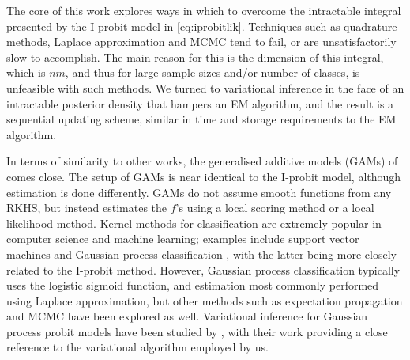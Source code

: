 \documentclass[showframe,11pt,twoside,openright]{report}
\begin{document}
The core of this work explores ways in which to overcome the intractable integral presented by the I-probit model in \cref{eq:iprobitlik}.
Techniques such as quadrature methods, Laplace approximation and MCMC tend to fail, or are unsatisfactorily slow to accomplish.
The main reason for this is the dimension of this integral, which is $nm$, and thus for large sample sizes and/or number of classes, is unfeasible with such methods.
We turned to variational inference in the face of an intractable posterior density that hampers an EM algorithm, and the result is a sequential updating scheme, similar in time and storage requirements to the EM algorithm.

In terms of similarity to other works, the generalised additive models (GAMs) of \citet{hastie1986} comes close.
The setup of GAMs is near identical to the I-probit model, although estimation is done differently. 
GAMs do not assume smooth functions from any RKHS, but instead estimates the $f$'s using a local scoring method or a local likelihood method.
Kernel methods for classification are extremely popular in computer science and machine learning; examples include support vector machines \citep{scholkopf2002learning} and Gaussian process classification \citep{rasmussen2006gaussian}, with the latter being more closely related to the I-probit method.
However, Gaussian process classification typically uses the logistic sigmoid function, and estimation most commonly performed using Laplace approximation, but other methods such as expectation propagation \citep{minka2001expectation} and MCMC \citep{neal1999} have been explored as well.
Variational inference for Gaussian process probit models have been studied by \citet{girolami2006variational}, with their work providing a close reference to the variational algorithm employed by us.
\end{document}
